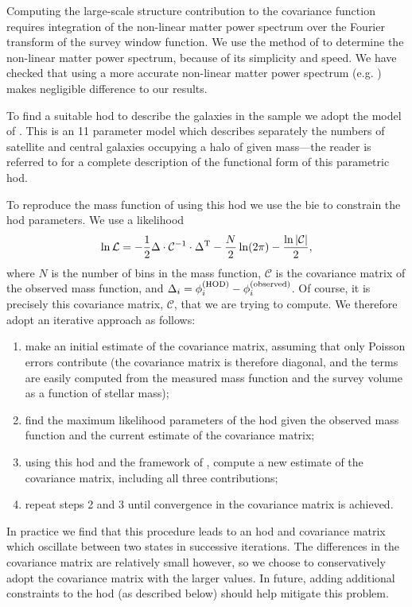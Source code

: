 Computing the large-scale structure contribution to the covariance function requires integration of the non-linear matter power spectrum over the Fourier transform of the survey window function. We use the method of \cite{peacock_non-linear_1996} to determine the non-linear matter power spectrum, because of its simplicity and speed. We have checked that using a more accurate non-linear matter power spectrum (e.g. \citealt{lawrence_coyote_2010}) makes negligible difference to our results.

To find a suitable \gls{hod} to describe the galaxies in the \cite{li_distribution_2009} sample we adopt the model of \cite{behroozi_comprehensive_2010}. This is an 11 parameter model which describes separately the numbers of satellite and central galaxies occupying a halo of given mass---the reader is referred to \cite{behroozi_comprehensive_2010} for a complete description of the functional form of this parametric \gls{hod}. 

To reproduce the mass function of \cite{li_distribution_2009} using this \gls{hod} we use the \gls{bie} \citep{weinberg_computational_2012} to constrain the \gls{hod} parameters. We use a likelihood
\begin{equation}
 \ln \mathcal{L} = -{1\over 2} \Delta\cdot \mathcal{C}^{-1}\cdot \Delta^{\rm T} - {N \over 2} \ln(2\pi) - {\ln |\mathcal{C}| \over 2},
\end{equation}
where $N$ is the number of bins in the mass function, $\mathcal{C}$ is the covariance matrix of the observed mass function, and $\Delta_i = \phi_i^{\rm (HOD)} - \phi_i^{\rm (observed)}$. Of course, it is precisely this covariance matrix, $\mathcal{C}$, that we are trying to compute. We therefore adopt an iterative approach as follows:
\begin{enumerate}
 \item make an initial estimate of the covariance matrix, assuming that only Poisson errors contribute (the covariance matrix is therefore diagonal, and the terms are easily computed from the measured mass function and the survey volume as a function of stellar mass);
 \item find the maximum likelihood parameters of the \gls{hod} given the observed mass function and the current estimate of the covariance matrix;
 \item using this \gls{hod} and the framework of \cite{smith_how_2012}, compute a new estimate of the covariance matrix, including all three contributions;
 \item repeat steps 2 and 3 until convergence in the covariance matrix is achieved.
\end{enumerate}
In practice we find that this procedure leads to an \gls{hod} and covariance matrix which oscillate between two states in successive iterations. The differences in the covariance matrix are relatively small however, so we choose to conservatively adopt the covariance matrix with the larger values. In future, adding additional constraints to the \gls{hod} (as described below) should help mitigate this problem.


